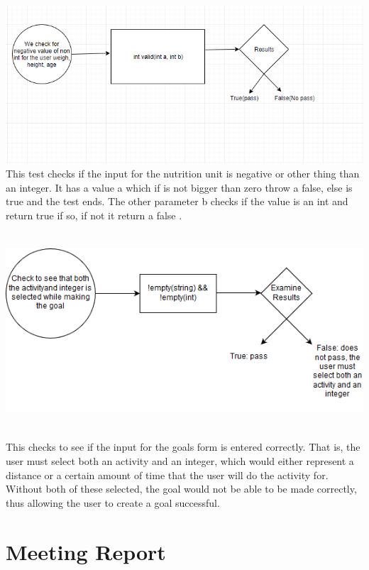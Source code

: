 \documentclass[a4paper]{article}
\begin{document}
\includegraphics[width=\textwidth, height=8 cm]{nuberInput.png}
This test checks if the input for the nutrition unit is negative or other thing than an integer. It has a value a which if is not bigger than zero throw a false, else is true and the test ends.
The other parameter b checks if the value is an int and return true if so, if not it return a false .
\newline
\newline
\includegraphics[width=\textwidth, height=8cm]{goals.png}
This checks to see if the input for the goals form is entered correctly. That is, the user must select both an activity and an integer, which would either represent a distance or a certain amount of time that the user will do the activity for. Without both of these selected, the goal would not be able to be made correctly, thus allowing the user to create a goal successful. 

\section{Meeting Report}
\end{document}
